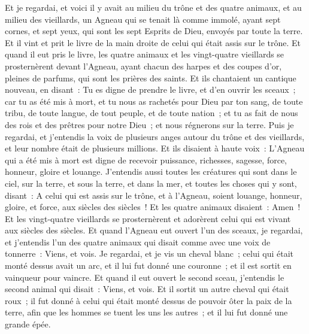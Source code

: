 \begin{multicols}{2}
Et je regardai, et voici il y avait au milieu du trône et des quatre animaux, et au milieu des vieillards, un Agneau qui se tenait là comme immolé, ayant sept cornes, et sept yeux, qui sont les sept Esprits de Dieu, envoyés par toute la terre.
Et il vint et prit le livre de la main droite de celui qui était assis sur le trône.
Et quand il eut pris le livre, les quatre animaux et les vingt-quatre vieillards se prosternèrent devant l'Agneau, ayant chacun des harpes et des coupes d'or, pleines de parfums, qui sont les prières des saints.
Et ils chantaient un cantique nouveau, en disant~: Tu es digne de prendre le livre, et d'en ouvrir les sceaux~; car tu as été mis à mort, et tu nous as rachetés pour Dieu par ton sang, de toute tribu, de toute langue, de tout peuple, et de toute nation~;
et tu as fait de nous des rois et des prêtres pour notre Dieu~; et nous régnerons sur la terre.
Puis je regardai, et j'entendis la voix de plusieurs anges autour du trône et des vieillards, et leur nombre était de plusieurs millions.
Et ils disaient à haute voix~: L'Agneau qui a été mis à mort est digne de recevoir puissance, richesses, sagesse, force, honneur, gloire et louange.
J'entendis aussi toutes les créatures qui sont dans le ciel, sur la terre, et sous la terre, et dans la mer, et toutes les choses qui y sont, disant~: A celui qui est assis sur le trône, et à l'Agneau, soient louange, honneur, gloire, et force, aux siècles des siècles~!
Et les quatre animaux disaient~: Amen~! Et les vingt-quatre vieillards se prosternèrent et adorèrent celui qui est vivant aux siècles des siècles.
\VerseOne{}Et quand l'Agneau eut ouvert l'un des sceaux, je regardai, et j'entendis l'un des quatre animaux qui disait comme avec une voix de tonnerre~: Viens, et vois.
Je regardai, et je vis un cheval blanc~; celui qui était monté dessus avait un arc, et il lui fut donné une couronne~; et il est sortit en vainqueur pour vaincre.
Et quand il eut ouvert le second sceau, j'entendis le second animal qui disait~: Viens, et vois.
Et il sortit un autre cheval qui était roux~; il fut donné à celui qui était monté dessus de pouvoir ôter la paix de la terre, afin que les hommes se tuent les uns les autres~; et il lui fut donné une grande épée.

\end{multicols}
